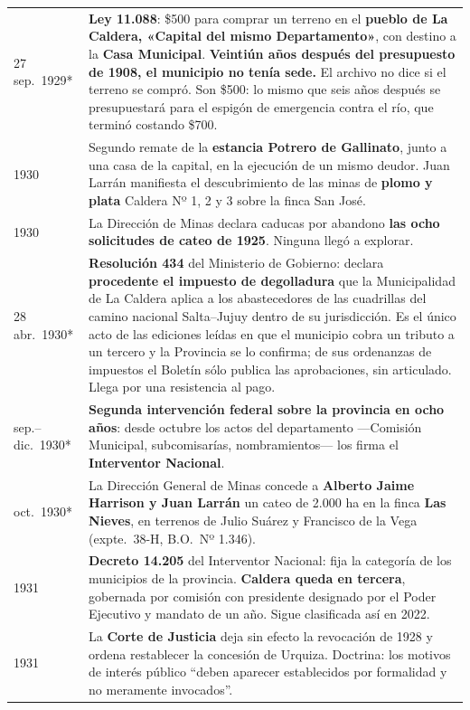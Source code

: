 \begin{longtable}{@{}p{2.7cm}p{10.3cm}@{}}
27 sep.\ 1929* & \textbf{Ley 11.088}: \$500 para comprar un terreno en el \textbf{pueblo de La Caldera, «Capital del mismo Departamento»}, con destino a la \textbf{Casa Municipal}. \textbf{Veintiún años después del presupuesto de 1908, el municipio no tenía sede.} El archivo no dice si el terreno se compró. Son \$500: lo mismo que seis años después se presupuestará para el espigón de emergencia contra el río, que terminó costando \$700. \\
1930 & Segundo remate de la \textbf{estancia Potrero de Gallinato}, junto a una casa de la capital, en la ejecución de un mismo deudor. Juan Larrán manifiesta el descubrimiento de las minas de \textbf{plomo y plata} Caldera Nº 1, 2 y 3 sobre la finca San José. \\
1930 & La Dirección de Minas declara caducas por abandono \textbf{las ocho solicitudes de cateo de 1925}. Ninguna llegó a explorar. \\
28 abr.\ 1930* & \textbf{Resolución 434} del Ministerio de Gobierno: declara \textbf{procedente el impuesto de degolladura} que la Municipalidad de La Caldera aplica a los abastecedores de las cuadrillas del camino nacional Salta--Jujuy dentro de su jurisdicción. Es el único acto de las ediciones leídas en que el municipio cobra un tributo a un tercero y la Provincia se lo confirma; de sus ordenanzas de impuestos el Boletín sólo publica las aprobaciones, sin articulado. Llega por una resistencia al pago. \\
sep.--dic.\ 1930* & \textbf{Segunda intervención federal sobre la provincia en ocho años}: desde octubre los actos del departamento ---Comisión Municipal, subcomisarías, nombramientos--- los firma el \textbf{Interventor Nacional}. \\
oct.\ 1930* & La Dirección General de Minas concede a \textbf{Alberto Jaime Harrison y Juan Larrán} un cateo de 2.000 ha en la finca \textbf{Las Nieves}, en terrenos de Julio Suárez y Francisco de la Vega (expte.\ 38-H, B.O.\ Nº 1.346). \\
1931 & \textbf{Decreto 14.205} del Interventor Nacional: fija la categoría de los municipios de la provincia. \textbf{Caldera queda en tercera}, gobernada por comisión con presidente designado por el Poder Ejecutivo y mandato de un año. Sigue clasificada así en 2022. \\
1931 & La \textbf{Corte de Justicia} deja sin efecto la revocación de 1928 y ordena restablecer la concesión de Urquiza\index{Urquiza, Francisco S.}. Doctrina: los motivos de interés público ``deben aparecer establecidos por formalidad y no meramente invocados''. \\

\end{longtable}
